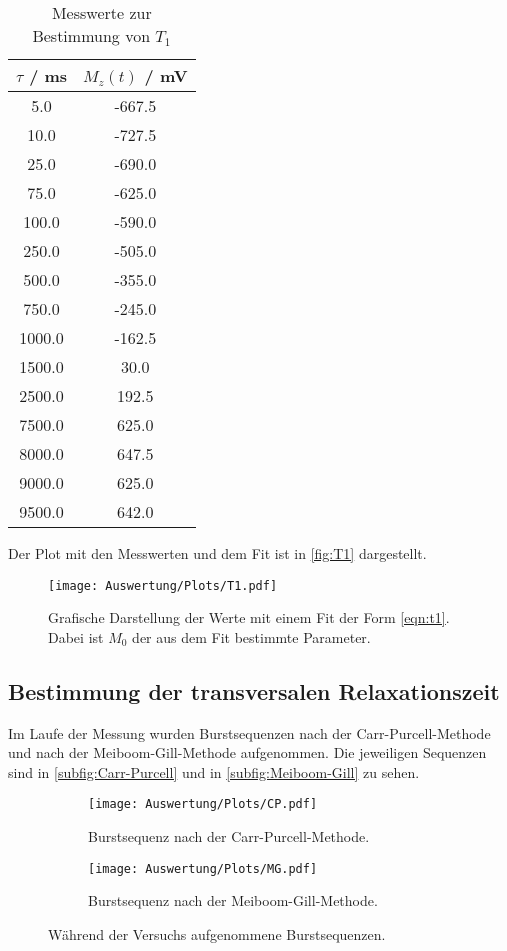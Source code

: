 \begin{table}
  \centering
  \caption{Messwerte zur Bestimmung von $T_1$}
  \label{tab:t1}
  \begin{tabular}{c c}
    \toprule
    $\tau$ / \si{\ms} & $M_z(t)$ / \si{\mV} \\
    \midrule
    5.0 & -667.5 \\
    10.0 & -727.5 \\
    25.0 & -690.0 \\
    75.0 & -625.0 \\
    100.0 & -590.0 \\
    250.0 & -505.0 \\
    500.0 & -355.0 \\
    750.0 & -245.0 \\
    1000.0 & -162.5 \\
    1500.0 & 30.0 \\
    2500.0 & 192.5 \\
    7500.0 & 625.0 \\
    8000.0 & 647.5 \\
    9000.0 & 625.0 \\
    9500.0 & 642.0 \\
    \bottomrule
  \end{tabular}
\end{table}
Der Plot mit den Messwerten und dem Fit ist in \autoref{fig:T1} dargestellt.

\begin{figure}
  \centering
  \texttt{[image: Auswertung/Plots/T1.pdf]}
  \caption{Grafische Darstellung der Werte mit einem Fit der Form
  \eqref{eqn:t1}. Dabei ist $M_0$ der aus dem Fit bestimmte Parameter.}
  \label{fig:T1}
\end{figure}

\subsection{Bestimmung der transversalen Relaxationszeit}
Im Laufe der Messung wurden Burstsequenzen nach der Carr-Purcell-Methode und
nach der Meiboom-Gill-Methode aufgenommen. Die jeweiligen Sequenzen sind in
\autoref{subfig:Carr-Purcell} und in \autoref{subfig:Meiboom-Gill} zu sehen.

\begin{figure}
  \centering
  \begin{subfigure}{0.469\textwidth}
    \centering
    \texttt{[image: Auswertung/Plots/CP.pdf]}
    \caption{Burstsequenz nach der Carr-Purcell-Methode.}
    \label{subfig:Carr-Purcell}
  \end{subfigure}
  \qquad
  \begin{subfigure}{0.469\textwidth}
    \centering
    \texttt{[image: Auswertung/Plots/MG.pdf]}
    \caption{Burstsequenz nach der Meiboom-Gill-Methode.}
    \label{subfig:Meiboom-Gill}
  \end{subfigure}
  \caption{Während der Versuchs aufgenommene Burstsequenzen.}
  \label{fig:Burstsequenzen}
\end{figure}

